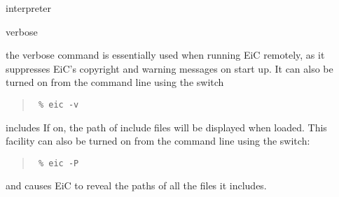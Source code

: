 \begin{Ventry} {interpreter}
\item[verbose]
\label{item:verbose}

the verbose command is essentially used when running EiC remotely, as
it suppresses EiC's copyright and warning messages on start up. It can
also be turned on from the command line using the switch 
\begin{quote}
\begin{verbatim}
 % eic -v
\end{verbatim}
\end{quote}     

\item[includes]
\label{item:includes} 
If on, the path of include files will be displayed when loaded. This
facility can also be turned on from the command line using 
the  switch:
\begin{quote}
\begin{verbatim}
 % eic -P
\end{verbatim}
\end{quote}     
and causes EiC to reveal the paths of all the files it
includes.

\end{Ventry}
\normalsize














